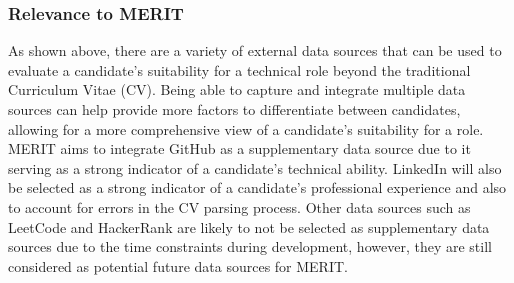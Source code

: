\subsubsection{Relevance to MERIT}
As shown above, there are a variety of external data sources that can be used to evaluate a candidate's suitability for a technical role
beyond the traditional Curriculum Vitae (CV). Being able to capture and integrate multiple data sources can help provide more factors
to differentiate between candidates, allowing for a more comprehensive view of a candidate's suitability for a role. MERIT aims to 
integrate GitHub as a supplementary data source due to it serving as a strong indicator of a candidate's technical ability. LinkedIn
will also be selected as a strong indicator of a candidate's professional experience and also to account for errors in the CV parsing process.
Other data sources such as LeetCode and HackerRank are likely to not be selected as supplementary data sources due to the time 
constraints during development, however, they are still considered as potential future data sources for MERIT.


